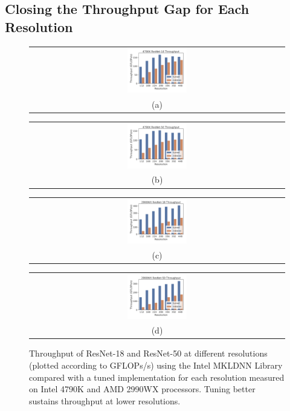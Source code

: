 \subsection{Closing the Throughput Gap for Each Resolution}
\label{sec:tuning}
\begin{figure}[t]
    \centering
    \begin{tabular}{@{}c@{}}
    \includegraphics[width=0.24\textwidth]{e2e_figures/4790K_perf_data_resnet18.pdf}\\
    \small (a)
    \end{tabular}
    \begin{tabular}{@{}c@{}}
    \includegraphics[width=0.24\textwidth]{e2e_figures/4790K_perf_data_resnet50.pdf}\\
    \small (b)
    \end{tabular}
    \begin{tabular}{@{}c@{}}
    \includegraphics[width=0.24\textwidth]{e2e_figures/2990WX_perf_data_resnet18.pdf}\\
    \small (c)
    \end{tabular}
    \begin{tabular}{@{}c@{}}
    \includegraphics[width=0.24\textwidth]{e2e_figures/2990WX_perf_data_resnet50.pdf}\\
    \small (d)
    \end{tabular}
    \caption{Throughput of ResNet-18 and ResNet-50 at different resolutions (plotted according to GFLOPs/s) using the Intel MKLDNN Library compared with a tuned implementation for each resolution measured on Intel 4790K and AMD 2990WX processors. Tuning better sustains throughput at lower resolutions.}
    \label{fig:tuning}
\end{figure}
